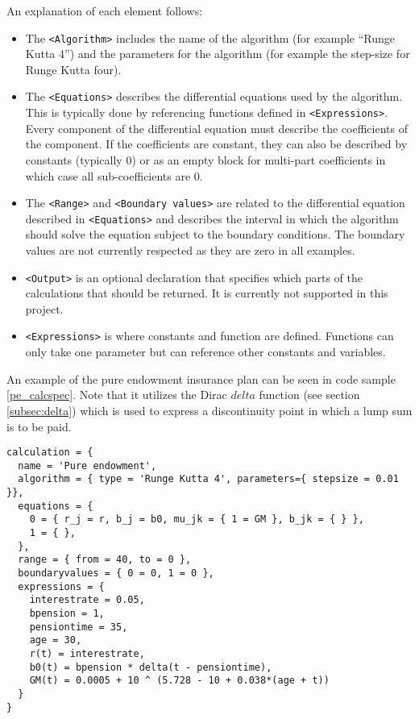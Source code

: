 An explanation of each element follows:
\begin{itemize}
\item The \lstinline$<Algorithm>$ includes the name of the algorithm (for example ``Runge Kutta 4'') and the parameters for the algorithm (for example the step-size for Runge Kutta four).
\item The \lstinline$<Equations>$ describes the differential equations used by the algorithm. This is typically done by referencing functions defined in \lstinline$<Expressions>$. Every component of the differential equation must describe the coefficients of the component. If the coefficients are constant, they can also be described by constants (typically 0) or as an empty block for multi-part coefficients in which case all sub-coefficients are 0.
\item The \lstinline$<Range>$ and \lstinline$<Boundary values>$ are related to the differential equation described in \lstinline$<Equations>$ and describes the interval in which the algorithm should solve the equation subject to the boundary conditions. The boundary values are not currently respected as they are zero in all examples.
\item \lstinline$<Output>$ is an optional declaration that specifies which parts of the calculations that should be returned. It is currently not supported in this project. %
\item \lstinline$<Expressions>$ is where constants and function are defined. Functions can only take one parameter but can reference other constants and variables.
\end{itemize}

An example of the pure endowment insurance plan can be seen in code sample \ref{pe_calcspec}. 
Note that it utilizes the Dirac $delta$ function\cite{hassani2009dirac} (see section \ref{subsec:delta}) which is used to express a discontinuity point in which a lump sum is to be paid.


\begin{lstlisting}[caption=The pure endowment insurance plan expressed in CalcSpec, label=pe_calcspec, language=calcspec]
calculation = {
  name = 'Pure endowment',
  algorithm = { type = 'Runge Kutta 4', parameters={ stepsize = 0.01 }},
  equations = { 
    0 = { r_j = r, b_j = b0, mu_jk = { 1 = GM }, b_jk = { } },
    1 = { },
  },
  range = { from = 40, to = 0 },
  boundaryvalues = { 0 = 0, 1 = 0 },
  expressions = {
    interestrate = 0.05,
    bpension = 1,
    pensiontime = 35,
    age = 30,
    r(t) = interestrate,
    b0(t) = bpension * delta(t - pensiontime),
    GM(t) = 0.0005 + 10 ^ (5.728 - 10 + 0.038*(age + t))
  }
}
\end{lstlisting}

